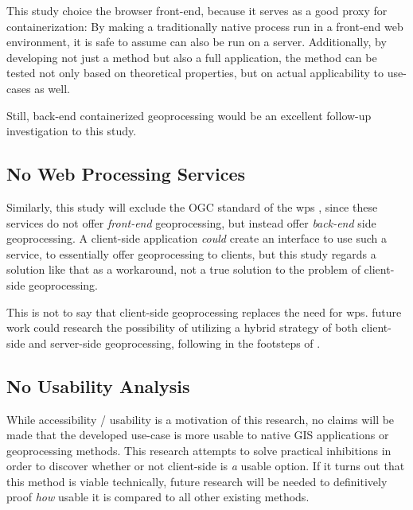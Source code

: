 This study choice the browser front-end, because it serves as a good proxy for containerization:
By making a traditionally native process run in a front-end web environment, it is safe to assume can also be run on a server. 
Additionally, by developing not just a method but also a full application, the method can be tested not only based on theoretical properties, but on actual applicability to use-cases as well. 

Still, back-end containerized geoprocessing would be an excellent follow-up investigation to this study. 

\subsection*{ No Web Processing Services } 
Similarly, this study will exclude the OGC standard of the \ac{wps} \cite{ogc_web_2015}, since these services do not offer \emph{front-end} geoprocessing, but instead offer \emph{back-end} side geoprocessing. A client-side application \textit{could} create an interface to use such a service, to essentially offer geoprocessing to clients, but this study regards a solution like that as a workaround, not a true solution to the problem of client-side geoprocessing. 

This is not to say that client-side geoprocessing replaces the need for \ac{wps}. 
future work could research the possibility of utilizing a hybrid strategy of both client-side and server-side geoprocessing, following in the footsteps of \cite{panidi_hybrid_2015}. 

\subsection*{ No Usability Analysis } %
While accessibility / usability is a motivation of this research, no claims will be made that the developed use-case is more usable to native GIS applications or geoprocessing methods. This research attempts to solve practical inhibitions in order to discover whether or not client-side is \emph{a} usable option. If it turns out that this method is viable technically, future research will be needed to definitively proof \emph{how} usable it is compared to all other existing methods.  


